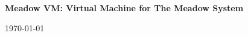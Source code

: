 \documentclass{pamsbook}
\begin{document}
\small


\begin{center}
{\large\bf Meadow VM:  Virtual Machine for The Meadow System}
\\

\vspace*{0.8cm}

{\small\today}

\vspace*{0.8cm}

\end{center}







\end{document}
